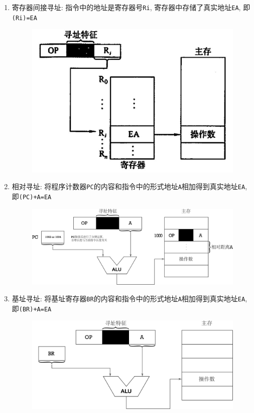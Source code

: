 \begin{enumerate}
\begin{figure}[H]
\end{figure}
\item 寄存器间接寻址: 指令中的地址是寄存器号\verb|Ri|, 寄存器中存储了真实地址\verb|EA|, 即\verb|(Ri)=EA|
\begin{figure}[H]
\centering
\includegraphics[scale=.6]{img/figure6.png}
\end{figure}
\item 相对寻址: 将程序计数器\verb|PC|的内容和指令中的形式地址\verb|A|相加得到真实地址\verb|EA|, 即\verb|(PC)+A=EA|
\begin{figure}[H]
\centering
\includegraphics[scale=.6]{img/figure7}
\end{figure}
\item 基址寻址: 将基址寄存器\verb|BR|的内容和指令中的形式地址\verb|A|相加得到真实地址\verb|EA|, 即\verb|(BR)+A=EA|
\begin{figure}[H]
\centering
\includegraphics[scale=.6]{img/figure8}
\end{figure}
\end{enumerate}
